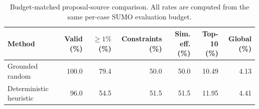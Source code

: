 \begin{table}[!ht]
    \caption{Budget-matched proposal-source comparison. All rates are computed from the same per-case SUMO evaluation budget.}
    \label{tab:proposal-source-comparison}
    \begin{center}
    \begin{tabular}{lrrrrrr}
        \hline
        Method & Valid (\%) & $\geq1\%$ (\%) & Constraints (\%) & Sim. eff. (\%) & Top-10 (\%) & Global (\%) \\
        \hline
        Grounded random & 100.0 & 79.4 & 50.0 & 50.0 & 10.49 & 4.13 \\
        Deterministic heuristic & 96.0 & 54.5 & 51.5 & 51.5 & 11.95 & 4.41 \\
        \hline
    \end{tabular}
    \end{center}
\end{table}
